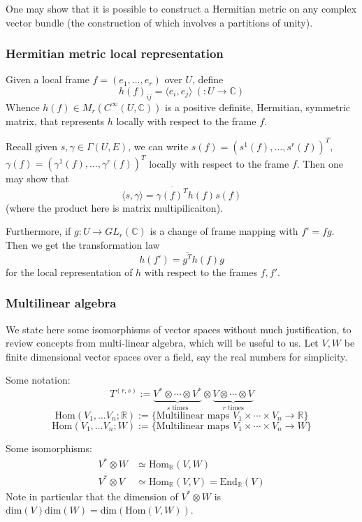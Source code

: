 \documentclass[a4paper]{article}
\theoremstyle{definition} \newtheorem*{definition}{Definition}
\theoremstyle{definition} \newtheorem*{definitions}{Definitions}
\theoremstyle{plain} \newtheorem{theorem}{Theorem}[section]
\theoremstyle{plain} \newtheorem{proposition}[theorem]{Proposition}
\theoremstyle{plain} \newtheorem{corollary}[theorem]{Corollary}
\theoremstyle{plain} \newtheorem{lemma}[theorem]{Lemma}
\theoremstyle{plain} \newtheorem{example}[theorem]{Example}
\newcommand{\realnos}{\mathbb{R}}
\newcommand{\complexnos}{\mathbb{C}}
\newcommand{\smoothCmaps}{C^\infty (U, \complexnos)}
\newcommand{\Hom}{\text{Hom}}
\begin{document}
One may show that it is possible to construct a Hermitian metric on any complex vector bundle (the construction of which involves a partitions of unity). 

\subsubsection{Hermitian metric local representation}
Given a local frame $f=(e_1, \ldots, e_r)$ over $U$, define 
$$h(f)_{ij}=\langle e_i, e_j \rangle \ (:U\to \complexnos)$$
Whence $h(f)\in M_r(\smoothCmaps)$ is a positive definite, Hermitian, symmetric matrix, that represents $h$ locally with respect to the frame $f$. 

Recall given $s, \gamma\in \Gamma(U, E)$, we can write $s(f)=(s^1(f), \ldots, s^r(f))^T$, $\gamma(f)=(\gamma^1(f), \ldots, \gamma^r(f))^T$ locally with respect to the frame $f$. Then one may show that 
$$\langle s, \gamma \rangle = \overline{\gamma(f)^T}h(f)s(f)$$
(where the product here is matrix multipilicaiton).

Furthermore, if $g:U\to GL_r(\complexnos)$ is a change of frame mapping with $f'=fg$. Then we get the transformation law
$$h(f')=\overline{g^T}h(f)g$$
for the local representation of $h$ with respect to the frames $f, f'$.

\subsubsection{Multilinear algebra}
We state here some isomorphisms of vector spaces without much justification, to review concepts from multi-linear algebra, which will be useful to us. Let $V, W$ be finite dimensional vector spaces over a field, say the real numbers for simplicity. 

Some notation:
$$T^{(r,s)}:=\underbrace{V^*\otimes \cdots \otimes V^*}_{s \text{ times}} \otimes \underbrace{V \otimes \cdots \otimes V}_{r \text{ times}} $$
$$\Hom(V_1, \ldots V_n; \realnos):= \{\text{Multilinear maps } V_1\times \cdots \times V_n \to \realnos\}$$
$$\Hom(V_1, \ldots V_n; W):= \{\text{Multilinear maps } V_1\times \cdots \times V_n \to W\}$$

Some isomorphisms:
\begin{align*}
V^*\otimes W & \simeq \Hom_\realnos(V, W) \\
V^*\otimes V & \simeq \Hom_\realnos(V, V) = \text{End}_\realnos (V) 
\end{align*}
Note in particular that the dimension of $V^*\otimes W$ is $\text{dim}(V)\text{dim}(W)=\text{dim}(\Hom(V, W))$.
\end{document}
